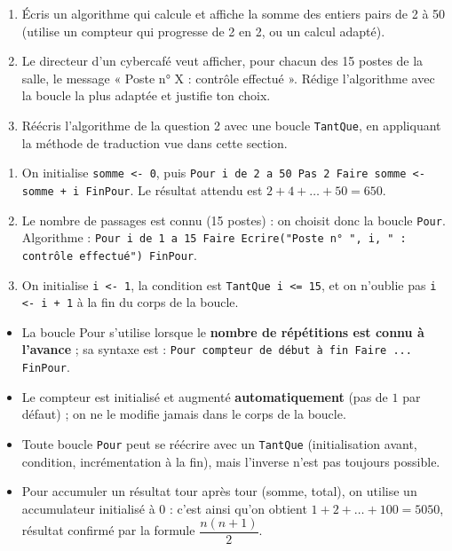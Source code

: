 \documentclass[11pt]{article}
\newcommand{\cle}[1]{{\popxbold\color{popdark}#1}}
\begin{document}
\begin{exercice}
\begin{enumerate}
  \item Écris un algorithme qui calcule et affiche la somme des entiers pairs de 2 à 50 (utilise un compteur qui progresse de 2 en 2, ou un calcul adapté).
  \item Le directeur d'un cybercafé veut afficher, pour chacun des 15 postes de la salle, le message « Poste n° X : contrôle effectué ». Rédige l'algorithme avec la boucle la plus adaptée et justifie ton choix.
  \item Réécris l'algorithme de la question 2 avec une boucle \texttt{TantQue}, en appliquant la méthode de traduction vue dans cette section.
\end{enumerate}
\end{exercice}

\begin{corrige}
\begin{enumerate}
  \item On initialise \texttt{somme <- 0}, puis \texttt{Pour i de 2 a 50 Pas 2 Faire somme <- somme + i FinPour}. Le résultat attendu est $2 + 4 + \dots + 50 = 650$.
  \item Le nombre de passages est connu (15 postes) : on choisit donc la boucle \texttt{Pour}. Algorithme : \texttt{Pour i de 1 a 15 Faire Ecrire("Poste n° ", i, " : contrôle effectué") FinPour}.
  \item On initialise \texttt{i <- 1}, la condition est \texttt{TantQue i <= 15}, et on n'oublie pas \texttt{i <- i + 1} à la fin du corps de la boucle.
\end{enumerate}
\end{corrige}

\begin{aretenir}
\begin{itemize}
  \item La boucle \cle{Pour} s'utilise lorsque le \textbf{nombre de répétitions est connu à l'avance} ; sa syntaxe est : \texttt{Pour compteur de début à fin Faire ... FinPour}.
  \item Le \cle{compteur} est initialisé et augmenté \textbf{automatiquement} (pas de $1$ par défaut) ; on ne le modifie jamais dans le corps de la boucle.
  \item Toute boucle \texttt{Pour} peut se réécrire avec un \texttt{TantQue} (initialisation avant, condition, incrémentation à la fin), mais l'inverse n'est pas toujours possible.
  \item Pour accumuler un résultat tour après tour (somme, total), on utilise un \cle{accumulateur} initialisé à $0$ : c'est ainsi qu'on obtient $1 + 2 + \dots + 100 = 5050$, résultat confirmé par la formule $\dfrac{n(n+1)}{2}$.
\end{itemize}
\end{aretenir}
\end{document}

